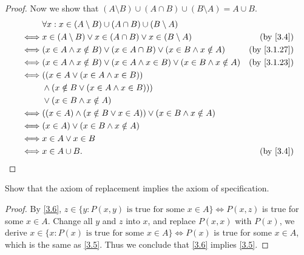 \begin{proof}
  Now we show that \((A \setminus B) \cup (A \cap B) \cup (B \setminus A) = A \cup B\).
  \begin{align*}
         & \forall x : x \in (A \setminus B) \cup (A \cap B) \cup (B \setminus A)                                              \\
    \iff & x \in (A \setminus B) \lor x \in (A \cap B) \lor x \in (B \setminus A)                  & \text{(by \cref{3.4})}    \\
    \iff & (x \in A \land x \notin B) \lor (x \in A \cap B) \lor (x \in B \land x \notin A)        & \text{(by \cref{3.1.27})} \\
    \iff & (x \in A \land x \notin B) \lor (x \in A \land x \in B) \lor (x \in B \land x \notin A) & \text{(by \cref{3.1.23})} \\
    \iff & ((x \in A \lor (x \in A \land x \in B))                                                                             \\
         & \land (x \notin B \lor (x \in A \land x \in B)))                                                                    \\
         & \lor (x \in B \land x \notin A)                                                                                     \\
    \iff & ((x \in A) \land (x \notin B \lor x \in A)) \lor (x \in B \land x \notin A)                                         \\
    \iff & (x \in A) \lor (x \in B \land x \notin A)                                                                           \\
    \iff & x \in A \lor x \in B                                                                                                \\
    \iff & x \in A \cup B.                                                                         & \text{(by \cref{3.4})}
  \end{align*}
\end{proof}

\begin{exercise}\label{ex 3.1.11}
  Show that the axiom of replacement implies the axiom of specification.
\end{exercise}

\begin{proof}
  By \cref{3.6}, \(z \in \{y : P(x, y) \text{ is true for some } x \in A\} \iff P(x, z)\) is true for some \(x \in A\).
  Change all \(y\) and \(z\) into \(x\), and replace \(P(x, x)\) with \(P(x)\), we derive \(x \in \{x : P(x) \text{ is true for some } x \in A\} \iff P(x)\) is true for some \(x \in A\), which is the same as \cref{3.5}.
  Thus we conclude that \cref{3.6} implies \cref{3.5}.
\end{proof}